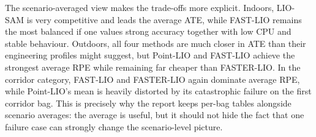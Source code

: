 \documentclass[12pt,a4paper]{report}
\begin{document}
\begin{table}[H]
\centering
\small
\caption{Average static rosbag results grouped by scenario pair.}
\label{tab:static-scenario-average}
\setlength{\tabcolsep}{4pt}
\renewcommand{\arraystretch}{1.05}
\end{table}

The scenario-averaged view makes the trade-offs more explicit. Indoors, LIO-SAM is very competitive and leads the average ATE, while FAST-LIO remains the most balanced if one values strong accuracy together with low CPU and stable behaviour. Outdoors, all four methods are much closer in ATE than their engineering profiles might suggest, but Point-LIO and FAST-LIO achieve the strongest average RPE while remaining far cheaper than FASTER-LIO. In the corridor category, FAST-LIO and FASTER-LIO again dominate average RPE, while Point-LIO's mean is heavily distorted by its catastrophic failure on the first corridor bag. This is precisely why the report keeps per-bag tables alongside scenario averages: the average is useful, but it should not hide the fact that one failure case can strongly change the scenario-level picture.
\end{document}
